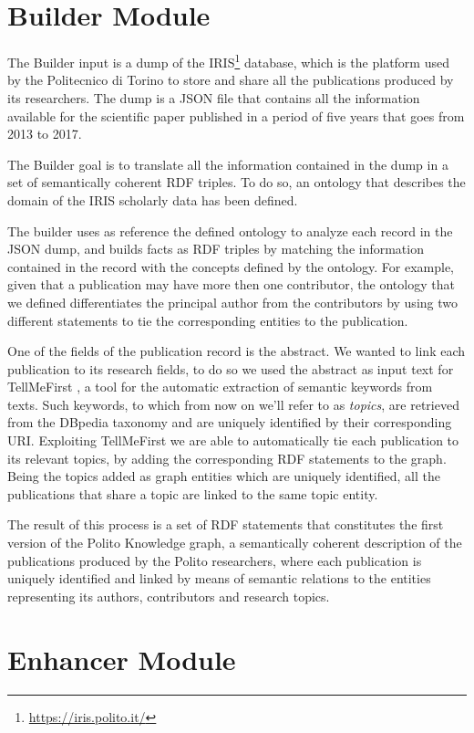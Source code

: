 \documentclass[%
    corpo=13.5pt,
    twoside,
    oldstyle,
    tipotesi=magistrale,
    greek,
    evenboxes
]{toptesi}
\begin{document}
\section{Builder Module}

The Builder input is a dump of the
IRIS\footnote{\url{https://iris.polito.it/}} database, which is the platform
used by the Politecnico di Torino to store and share all the
publications produced by its researchers. The dump is a JSON file that contains
all the information available for the scientific paper published in a period
of five years that goes from 2013 to 2017.

The Builder goal is to translate all the information contained in the
dump in a set of semantically coherent RDF triples. To do so, an ontology that
describes the domain of the IRIS scholarly data has been defined.

The builder uses as reference the defined ontology to analyze each record in
the JSON dump, and builds facts as RDF triples by matching the information
contained in the record with the concepts defined by the ontology.
For example, given that a publication may have more then one contributor, the
ontology that we defined differentiates the principal author from the
contributors by using two different statements to tie the corresponding entities
to the publication.

One of the fields of the publication record is the abstract. We wanted to
link each publication to its research fields, to do so we used the abstract
as input text for TellMeFirst \cite{rocha2015}, a tool for the automatic
extraction of semantic keywords from texts. Such keywords, to which from now
on we'll refer to as \emph{topics}, are retrieved from the DBpedia taxonomy
and are uniquely identified by their corresponding URI.
Exploiting TellMeFirst we are able to automatically tie each publication to
its relevant topics, by adding the corresponding RDF statements to the graph.
Being the topics added as graph entities which are uniquely identified, all the
publications that share a topic are linked to the same topic entity.

The result of this process is a set of RDF statements that constitutes the
first version of the Polito Knowledge graph, a semantically coherent description
of the publications produced by the Polito researchers, where each
publication is uniquely identified and linked by means of semantic relations
to the entities representing its authors, contributors and research topics.


\section{Enhancer Module}
\end{document}
